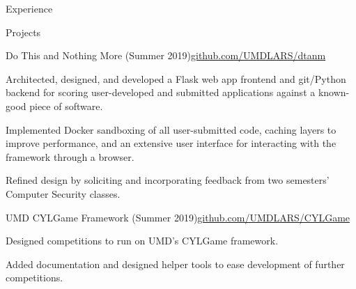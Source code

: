\documentclass{resume} %
\begin{document}
\begin{rSection}{Experience}
%

\end{rSection}

\begin{rSection}{Projects}

    \begin{rSubsection}{Do This and Nothing More \textnormal{(Summer 2019)}}{\href{https://github.com/UMDLARS/dtanm}{github.com/UMDLARS/dtanm}}{}\\
        \item Architected, designed, and developed a Flask web app frontend and
            git/Python backend for scoring user-developed and submitted
            applications against a known-good piece of software.
        \item Implemented Docker sandboxing of all user-submitted code, caching layers to
            improve performance, and an extensive user interface for interacting
            with the framework through a browser.
        \item Refined design by soliciting and incorporating feedback from
            two semesters' Computer Security classes.
    \end{rSubsection}

    \begin{rSubsection}{UMD CYLGame Framework \textnormal{(Summer 2019)}}{\href{https://github.com/UMDLARS/CYLGame}{github.com/UMDLARS/CYLGame}}{}\\
        \item Designed competitions to run on UMD's CYLGame framework.
        \item Added documentation and designed helper tools to ease
            development of further competitions.
    \end{rSubsection}

\end{rSection}
\end{document}
